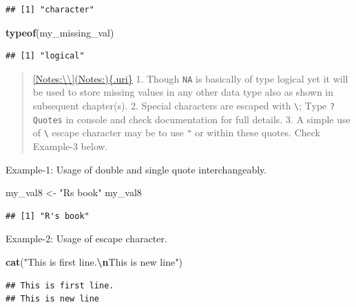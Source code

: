 \documentclass[
]{book}
\newenvironment{Shaded}{\begin{snugshade}}{\end{snugshade}}
\newcommand{\FunctionTok}[1]{\textcolor[rgb]{0.13,0.29,0.53}{\textbf{#1}}}
\newcommand{\NormalTok}[1]{#1}
\newcommand{\OtherTok}[1]{\textcolor[rgb]{0.56,0.35,0.01}{#1}}
\newcommand{\SpecialCharTok}[1]{\textcolor[rgb]{0.81,0.36,0.00}{\textbf{#1}}}
\newcommand{\StringTok}[1]{\textcolor[rgb]{0.31,0.60,0.02}{#1}}
\begin{document}
\begin{verbatim}
## [1] "character"
\end{verbatim}

\begin{Shaded}
\begin{Highlighting}[]
\FunctionTok{typeof}\NormalTok{(my\_missing\_val)}
\end{Highlighting}
\end{Shaded}

\begin{verbatim}
## [1] "logical"
\end{verbatim}

\begin{quote}
\href{\%5BNotes:\%5D(Notes:)\%7B.uri\%7D}{{[}Notes:\textbackslash\textbackslash{]}(Notes:)\{.uri\}} 1. Though \texttt{NA} is basically of type logical yet it will be used to store missing values in any other data type also as shown in subsequent chapter(s). 2. Special characters are escaped with \texttt{\textbackslash{}}; Type \texttt{?Quotes} in console and check documentation for full details. 3. A simple use of \texttt{\textbackslash{}} escape character may be to use \texttt{"} or \texttt{\textquotesingle{}} within these quotes. Check Example-3 below.
\end{quote}

Example-1: Usage of double and single quote interchangeably.

\begin{Shaded}
\begin{Highlighting}[]
\NormalTok{my\_val8 }\OtherTok{\textless{}{-}} \StringTok{"R\textquotesingle{}s book"}
\NormalTok{my\_val8}
\end{Highlighting}
\end{Shaded}

\begin{verbatim}
## [1] "R's book"
\end{verbatim}

Example-2: Usage of escape character.

\begin{Shaded}
\begin{Highlighting}[]
\FunctionTok{cat}\NormalTok{(}\StringTok{"This is first line.}\SpecialCharTok{\textbackslash{}n}\StringTok{This is new line"}\NormalTok{)}
\end{Highlighting}
\end{Shaded}

\begin{verbatim}
## This is first line.
## This is new line
\end{verbatim}
\end{document}
